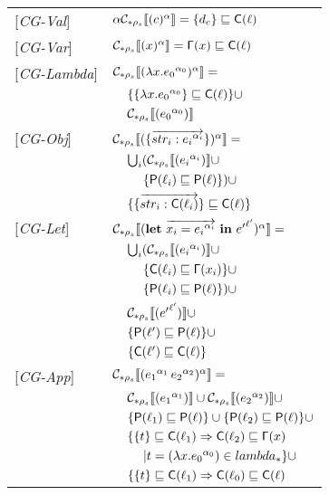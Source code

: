 \begin{table}
\begin{tabular}{l l l l}
{[\textit{CG-Val}]} & \multicolumn{3}{l}{$ \alpha\mathcal{C}_{*\rho_s}\llbracket (c)^\alpha \rrbracket = \{d_c\} \sqsubseteq \mathsf{C}(\ell)$} \\ 
{[\textit{CG-Var}]} & \multicolumn{3}{l}{$ \mathcal{C}_{*\rho_s}\llbracket (x)^\alpha \rrbracket = \mathsf{\Gamma}(x) \sqsubseteq \mathsf{C}(\ell)$} \\ 
{[\textit{CG-Lambda}]} & \multicolumn{3}{l}{$ \mathcal{C}_{*\rho_s}\llbracket (\lambda x.{e_0}^{\alpha_0})^\alpha \rrbracket = $}\\
&& \multicolumn{2}{l}{$\{\{\lambda x.{e_0}^{\alpha_0}\} \sqsubseteq \mathsf{C}(\ell)\}\cup $}\\
&& \multicolumn{2}{l}{$ \mathcal{C}_{*\rho_s}\llbracket ({e_0}^{\alpha_0}) \rrbracket $} \\
{[\textit{CG-Obj}]} & \multicolumn{3}{l}{$ \mathcal{C}_{*\rho_s}\llbracket (\{\overrightarrow{str_i : {e_i}^{\alpha_i}}\})^\alpha \rrbracket = $}\\
&& \multicolumn{2}{l}{$\bigcup_i (\mathcal{C}_{*\rho_s}\llbracket ({e_i}^{\alpha_i}) \rrbracket \cup$}\\
&&& $\{\mathsf{P}(\ell_i) \sqsubseteq \mathsf{P}(\ell)\})\cup$\\ 
&& \multicolumn{2}{l}{$\{ \{\overrightarrow{str_i : \mathsf{C}(\ell_i)}\} \sqsubseteq \mathsf{C}(\ell) \} $} \\
{[\textit{CG-Let}]} & \multicolumn{3}{l}{$\mathcal{C}_{*\rho_s}\llbracket (\mathbf{let}\ \overrightarrow{x_i = {e_i}^{\alpha_i}}\ \mathbf{in}\ {e'}^{\ell'})^\alpha \rrbracket = $}\\
&& \multicolumn{2}{l}{$ \bigcup_i (\mathcal{C}_{*\rho_s}\llbracket ({e_i}^{\alpha_i}) \rrbracket \cup$ }\\
&&& $ \{\mathsf{C}(\ell_i) \sqsubseteq \mathsf{\Gamma}(x_i)\} \cup$ \\
&&& $ \{ \mathsf{P}(\ell_i) \sqsubseteq \mathsf{P}(\ell) \}) \cup $ \\
&& \multicolumn{2}{l}{$ \mathcal{C}_{*\rho_s}\llbracket ({e'}^{\ell'}) \rrbracket \cup$} \\
&& \multicolumn{2}{l}{$ \{\mathsf{P}(\ell') \sqsubseteq \mathsf{P}(\ell)\} \cup$}\\
&& \multicolumn{2}{l}{$ \{\mathsf{C}(\ell') \sqsubseteq \mathsf{C}(\ell)\} $}\\
{[\textit{CG-App}]}&\multicolumn{3}{l}{$ \mathcal{C}_{*\rho_s}\llbracket ({e_1}^{\alpha_1}\, {e_2}^{\alpha_2})^\alpha \rrbracket = $}\\
&& \multicolumn{2}{l}{$\mathcal{C}_{*\rho_s}\llbracket ({e_1}^{\alpha_1}) \rrbracket \cup \mathcal{C}_{*\rho_s}\llbracket ({e_2}^{\alpha_2}) \rrbracket \cup$} \\
&& \multicolumn{2}{l}{$\{ \mathsf{P}(\ell_1) \sqsubseteq \mathsf{P}(\ell) \} \cup \{ \mathsf{P}(\ell_2) \sqsubseteq \mathsf{P}(\ell) \}\cup$} \\
&& \multicolumn{2}{l}{$\{\{ t \} \sqsubseteq \mathsf{C}(\ell_1) \Rightarrow \mathsf{C}(\ell_2) \sqsubseteq \mathsf{\Gamma}(x)$}\\
&&&$| t = (\lambda x.{e_0}^{\alpha_0}) \in lambda_* \}\cup$\\
&& \multicolumn{2}{l}{$\{\{ t \} \sqsubseteq \mathsf{C}(\ell_1) \Rightarrow \mathsf{C}(\ell_0) \sqsubseteq \mathsf{C}(\ell)$}\\

\end{tabular}
\end{table}
